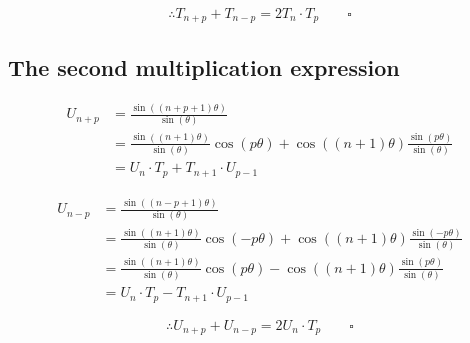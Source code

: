 \documentclass{article}
\begin{document}
\begin{equation*}
\therefore T_{n+p} + T_{n-p} = 2 T_n \cdot T_p \quad \quad \square
\end{equation*}

\subsection{The second multiplication expression}\label{deriv_mult2}

\begin{align*}
U_{n+p} &= \frac{\sin((n+p+1) \theta)}{\sin(\theta)} \\ 
&= \frac{\sin((n+1) \theta)}{\sin(\theta)} \cos(p \theta) + \cos((n+1) \theta) \frac{\sin(p \theta)}{\sin(\theta)} \\ 
&= U_n \cdot T_p + T_{n+1} \cdot U_{p-1}
\end{align*}

\begin{align*}
U_{n-p} &= \frac{\sin((n-p+1) \theta)}{\sin(\theta)} \\ 
&= \frac{\sin((n+1) \theta)}{\sin(\theta)} \cos(-p \theta) + \cos((n+1) \theta) \frac{\sin(-p \theta)}{\sin(\theta)} \\ 
&= \frac{\sin((n+1) \theta)}{\sin(\theta)} \cos(p \theta) - \cos((n+1) \theta) \frac{\sin(p \theta)}{\sin(\theta)} \\ 
&= U_n \cdot T_p - T_{n+1} \cdot U_{p-1}
\end{align*}

\begin{equation*}
\therefore U_{n+p} + U_{n-p} = 2 U_n \cdot T_p \quad \quad \square
\end{equation*}
\end{document}

